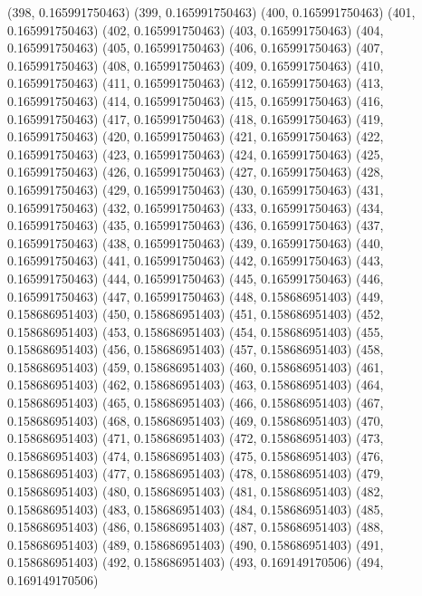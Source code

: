 {					(398, 0.165991750463)
					(399, 0.165991750463)
					(400, 0.165991750463)
					(401, 0.165991750463)
					(402, 0.165991750463)
					(403, 0.165991750463)
					(404, 0.165991750463)
					(405, 0.165991750463)
					(406, 0.165991750463)
					(407, 0.165991750463)
					(408, 0.165991750463)
					(409, 0.165991750463)
					(410, 0.165991750463)
					(411, 0.165991750463)
					(412, 0.165991750463)
					(413, 0.165991750463)
					(414, 0.165991750463)
					(415, 0.165991750463)
					(416, 0.165991750463)
					(417, 0.165991750463)
					(418, 0.165991750463)
					(419, 0.165991750463)
					(420, 0.165991750463)
					(421, 0.165991750463)
					(422, 0.165991750463)
					(423, 0.165991750463)
					(424, 0.165991750463)
					(425, 0.165991750463)
					(426, 0.165991750463)
					(427, 0.165991750463)
					(428, 0.165991750463)
					(429, 0.165991750463)
					(430, 0.165991750463)
					(431, 0.165991750463)
					(432, 0.165991750463)
					(433, 0.165991750463)
					(434, 0.165991750463)
					(435, 0.165991750463)
					(436, 0.165991750463)
					(437, 0.165991750463)
					(438, 0.165991750463)
					(439, 0.165991750463)
					(440, 0.165991750463)
					(441, 0.165991750463)
					(442, 0.165991750463)
					(443, 0.165991750463)
					(444, 0.165991750463)
					(445, 0.165991750463)
					(446, 0.165991750463)
					(447, 0.165991750463)
					(448, 0.158686951403)
					(449, 0.158686951403)
					(450, 0.158686951403)
					(451, 0.158686951403)
					(452, 0.158686951403)
					(453, 0.158686951403)
					(454, 0.158686951403)
					(455, 0.158686951403)
					(456, 0.158686951403)
					(457, 0.158686951403)
					(458, 0.158686951403)
					(459, 0.158686951403)
					(460, 0.158686951403)
					(461, 0.158686951403)
					(462, 0.158686951403)
					(463, 0.158686951403)
					(464, 0.158686951403)
					(465, 0.158686951403)
					(466, 0.158686951403)
					(467, 0.158686951403)
					(468, 0.158686951403)
					(469, 0.158686951403)
					(470, 0.158686951403)
					(471, 0.158686951403)
					(472, 0.158686951403)
					(473, 0.158686951403)
					(474, 0.158686951403)
					(475, 0.158686951403)
					(476, 0.158686951403)
					(477, 0.158686951403)
					(478, 0.158686951403)
					(479, 0.158686951403)
					(480, 0.158686951403)
					(481, 0.158686951403)
					(482, 0.158686951403)
					(483, 0.158686951403)
					(484, 0.158686951403)
					(485, 0.158686951403)
					(486, 0.158686951403)
					(487, 0.158686951403)
					(488, 0.158686951403)
					(489, 0.158686951403)
					(490, 0.158686951403)
					(491, 0.158686951403)
					(492, 0.158686951403)
					(493, 0.169149170506)
					(494, 0.169149170506)
}
